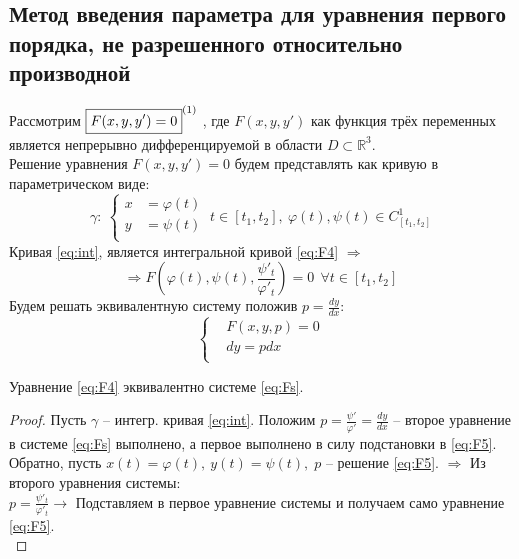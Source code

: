 \subsection{Метод введения параметра для уравнения первого порядка, не разрешенного относительно производной}
\begin{proposition}
	Рассмотрим $ \boxed{F(x,  y, y') = 0}^{\eqnum\label{eq:F4}} \ $, где $ F(x, y, y') $ как функция трёх переменных является непрерывно дифференцируемой в области $ D \subset \mathbb{ R }^3 $. \\
	Решение уравнения $F(x, y, y') = 0 $ будем представлять как кривую в параметрическом виде: \\
	\begin{equation} \label{eq:int}
	\gamma: \	\left\{
	\begin{aligned}
		x &= \varphi(t)  \\
		y &= \psi(t) \\   
	\end{aligned}
	\right. \ t \in [t_1, t_2], \ \varphi(t), \psi(t) \in C^1_{[t_1, t_2]}                                             
	\end{equation}
	Кривая \eqref{eq:int}, является интегральной кривой \eqref{eq:F4} $ \Rightarrow $ \\
	\begin{equation} \label{eq:F5}
	 \Rightarrow F\left(\varphi(t), \psi(t), \frac{\psi'_t}{\varphi'_t}\right) = 0 \ \ \forall t \in [t_1, t_2] 
	\end{equation}
	Будем решать эквивалентную систему положив $p = \frac{dy}{dx} $: 
	\begin{equation} \label{eq:Fs}
		\left\{
		\begin{aligned}
			&F(x, y, p) = 0  \\
			&dy = pdx \\   
		\end{aligned}
		\right.                                                          
	\end{equation}
\end{proposition}

\begin{proposition}
	Уравнение \eqref{eq:F4} эквивалентно системе \eqref{eq:Fs}.
\end{proposition}

\begin{proof}
	Пусть $\gamma $ -- интегр. кривая \eqref{eq:int}. Положим $ p = \frac{\psi'}{\varphi'} = \frac{dy}{dx} $ -- второе уравнение в системе \eqref{eq:Fs} выполнено, а первое выполнено в силу подстановки в \eqref{eq:F5}. Обратно, пусть $x(t) = \varphi(t), \ y(t) = \psi(t), \; p$ -- решение \eqref{eq:F5}. $ \Rightarrow$ Из второго уравнения системы:\\ 
	$ p = \frac{\psi'_t}{\varphi'_t} \rightarrow $ Подставляем в первое уравнение системы и получаем само уравнение \eqref{eq:F5}.\\
\end{proof}

